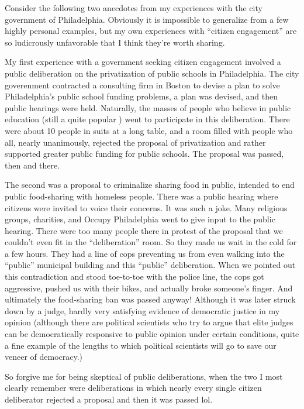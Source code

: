\documentclass[12pt,book]{article}
\begin{document}
Consider the following two anecdotes from my experiences with the city
government of Philadelphia. Obviously it is impossible to generalize
from a few highly personal examples, but my own experiences with
``citizen engagement'' are so ludicrously unfavorable that I think
they're worth sharing.

My first experience with a government seeking citizen engagement
involved a public deliberation on the privatization of public schools in
Philadelphia. The city goverenment contracted a consulting firm in
Boston to devise a plan to solve Philadelphia's public school funding
problems, a plan was devised, and then public hearings were held.
Naturally, the masses of people who believe in public education (still a
quite popular ) went to participate in this deliberation. There were
about 10 people in suits at a long table, and a room filled with people
who all, nearly unanimously, rejected the proposal of privatization and
rather supported greater public funding for public schools. The proposal
was passed, then and there.

The second was a proposal to criminalize sharing food in public,
intended to end public food-sharing with homeless people. There was a
public hearing where citizens were invited to voice their concerns. It
was such a joke. Many religious groups, charities, and Occupy
Philadelphia went to give input to the public hearing. There were too
many people there in protest of the proposal that we couldn't even fit
in the ``deliberation'' room. So they made us wait in the cold for a few
hours. They had a line of cops preventing us from even walking into the
``public'' municipal building and this ``public'' deliberation. When we
pointed out this contradiction and stood toe-to-toe with the police
line, the cops got aggressive, pushed us with their bikes, and actually
broke someone's finger. And ultimately the food-sharing ban was passed
anyway! Although it was later struck down by a judge, hardly very
satisfying evidence of democratic justice in my opinion (although there
are political scientists who try to argue that elite judges can be
democratically responsive to public opinion under certain conditions,
quite a fine example of the lengths to which political scientists will
go to save our veneer of democracy.)

So forgive me for being skeptical of public deliberations, when the two
I most clearly remember were deliberations in which nearly every single
citizen deliberator rejected a proposal and then it was passed lol.
\end{document}
